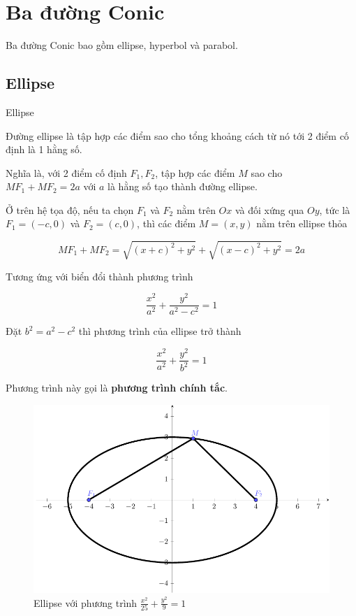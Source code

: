 \section{Ba đường Conic}

Ba đường Conic bao gồm ellipse, hyperbol và parabol.

\subsection{Ellipse}

\begin{defblock}{Ellipse}

    Đường ellipse là tập hợp các điểm sao cho tổng khoảng cách từ nó tới 2 điểm cố định là 1 hằng số.
\end{defblock}

Nghĩa là, với 2 điểm cố định $F_1, F_2$, tập hợp các điểm $M$ sao cho $M F_1 + M F_2 = 2a$ với $a$ là hằng số tạo thành đường ellipse.

Ở trên hệ tọa độ, nếu ta chọn $F_1$ và $F_2$ nằm trên $Ox$ và đối xứng qua $Oy$, tức là $F_1 = (-c, 0)$ và $F_2 = (c, 0)$, thì các điểm $M = (x, y)$ nằm trên ellipse thỏa

$$MF_1 + MF_2 = \sqrt{(x+c)^2 + y^2} + \sqrt{(x-c)^2 + y^2} = 2a$$

Tương ứng với biển đổi thành phương trình

$$\frac{x^2}{a^2} + \frac{y^2}{a^2 - c^2} = 1$$

Đặt $b^2 = a^2 - c^2$ thì phương trình của ellipse trở thành

$$\frac{x^2}{a^2} + \frac{y^2}{b^2} = 1$$

Phương trình này gọi là \textbf{phương trình chính tắc}.

\begin{figure}[ht]
    \centering
    \includegraphics[width=\textwidth]{pics/conics/ellipse.pdf}
    \caption{Ellipse với phương trình $\frac{x^2}{25} + \frac{y^2}{9} = 1$}
\end{figure}

